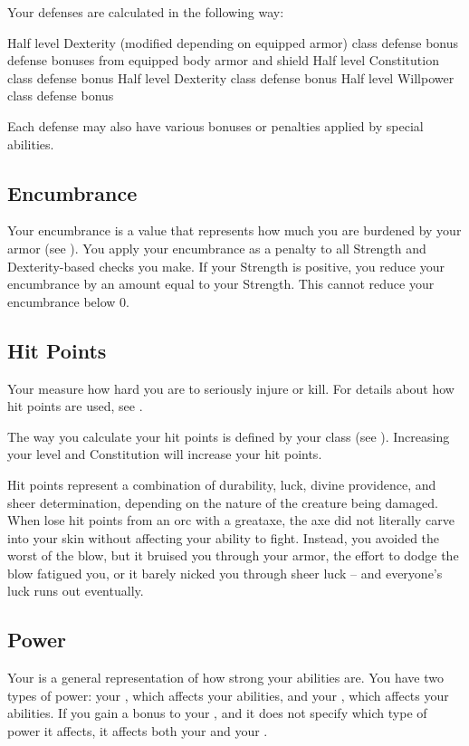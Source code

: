         Your defenses are calculated in the following way:
        \begin{itemize}
             Half level \add Dexterity (modified depending on equipped armor) \add class defense bonus \add defense bonuses from equipped body armor and shield
             Half level \add Constitution \add class defense bonus
             Half level \add Dexterity \add class defense bonus
             Half level \add Willpower \add class defense bonus
        \end{itemize}
        Each defense may also have various bonuses or penalties applied by special abilities.

    \subsection{Encumbrance}\label{Encumbrance}
        Your encumbrance is a value that represents how much you are burdened by your armor (see ).
        You apply your encumbrance as a penalty to all Strength and Dexterity-based checks you make.
        If your Strength is positive, you reduce your encumbrance by an amount equal to your Strength.
        This cannot reduce your encumbrance below 0.

    \subsection{Hit Points}\label{Hit Points}
        Your  measure how hard you are to seriously injure or kill.
        For details about how hit points are used, see .

        The way you calculate your hit points is defined by your class (see ).
        Increasing your level and Constitution will increase your hit points.

         Hit points represent a combination of durability, luck, divine providence, and sheer determination, depending on the nature of the creature being damaged.
        When lose hit points from an orc with a greataxe, the axe did not literally carve into your skin without affecting your ability to fight.
        Instead, you avoided the worst of the blow, but it bruised you through your armor, the effort to dodge the blow fatigued you, or it barely nicked you through sheer luck -- and everyone's luck runs out eventually.

    \subsection{Power}\label{Power}
        Your  is a general representation of how strong your abilities are.
        You have two types of power: your , which affects your \magical abilities, and your , which affects your  abilities.
        If you gain a bonus to your , and it does not specify which type of power it affects, it affects both your  and your .

